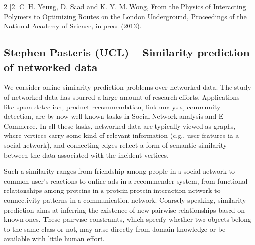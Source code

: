 \documentclass[10pt]{article}
\begin{document}
\begin{multicols}{2}
    [2] C. H. Yeung, D. Saad and K. Y. M. Wong, From the Physics of Interacting Polymers to Optimizing Routes on the London Underground, Proceedings of the National Academy of Science, in press (2013).

\subsection*{Stephen Pasteris (UCL) – Similarity prediction of networked data}

We consider online similarity prediction problems over networked data. The study of networked data has spurred a large amount of research efforts. Applications like spam detection, product recommendation, link analysis, community detection, are by now well-known tasks in Social Network analysis and E-Commerce. In all these tasks, networked data are typically viewed as graphs, where vertices carry some kind of relevant information (e.g., user features in a social network), and connecting edges reflect a form of semantic similarity between the data associated with the incident vertices.

Such a similarity ranges from friendship among people in a social network to common user’s reactions to online ads in a recommender system, from functional relationships among proteins in a protein-protein interaction network to connectivity patterns in a communication network. Coarsely speaking, similarity prediction aims at inferring the existence of new pairwise relationships based on known ones. These pairwise constraints, which specify whether two objects belong to the same class or not, may arise directly from domain knowledge or be available with little human effort.


\end{multicols}
\end{document}
